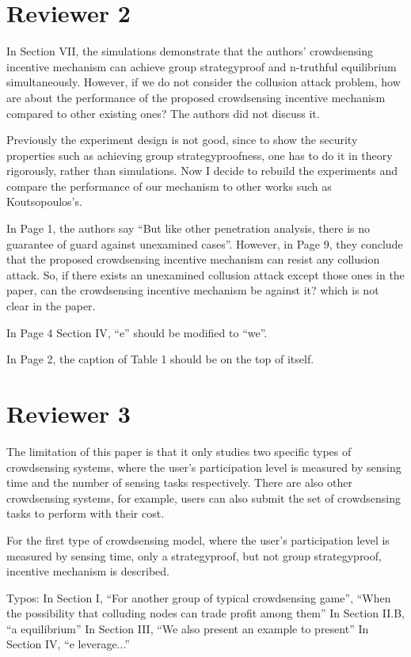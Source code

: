 \documentclass[a4paper,11pt]{exam}
\begin{document}
\begin{questions}
\section{Reviewer 2}
\question In Section VII, the simulations demonstrate that the authors’ crowdsensing incentive mechanism can achieve group strategyproof and n-truthful equilibrium simultaneously. However, if we do not consider the collusion attack problem, how are about the performance of the proposed crowdsensing incentive mechanism compared to other existing ones? The authors did not discuss it.  
\begin{solution}
Previously the experiment design is not good, since to show the security properties such as achieving group strategyproofness, one has to do it in theory rigorously, rather than simulations. Now I decide to rebuild the experiments and compare the performance of our mechanism to other works such as Koutsopoulos's.
\end{solution}

\question In Page 1, the authors say “But like other penetration analysis, there is no guarantee of guard against unexamined cases”. However, in Page 9, they conclude that the proposed crowdsensing incentive mechanism can resist any collusion attack. So, if there exists an unexamined collusion attack except those ones in the paper, can the  crowdsensing incentive mechanism be against it?  which is not clear in the paper.

\question In Page 4 Section IV, “e” should be modified to “we”.

\question In Page 2, the caption of Table 1  should be on the top of itself.

\section{Reviewer 3}
\question The limitation of this paper is that it only studies two specific types of crowdsensing systems, where the user's participation level is measured by sensing time and the number of sensing tasks respectively. There are also other crowdsensing systems, for example, users can also submit the set of crowdsensing tasks to perform with their cost.

\question For the first type of crowdsensing model, where the user's participation level is measured by sensing time, only a strategyproof, but not group strategyproof, incentive mechanism is described.

\question Typos: 
In Section I, ``For another group of typical crowdsensing game'', ``When the possibility that colluding nodes can trade profit among them''
In Section II.B, ``a equilibrium''
In Section III, ``We also present an example to present''
In Section IV, ``e leverage...''


\end{questions}
\end{document}
